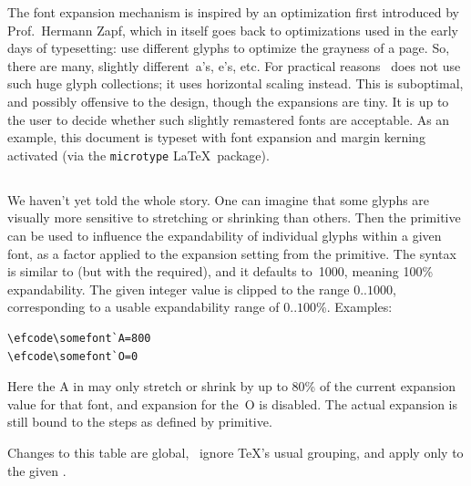 \documentclass{pdftexmanual}
\begin{document}
The font expansion mechanism is inspired by an optimization first
introduced by Prof.~Hermann Zapf, which in itself goes back to
optimizations used in the early days of typesetting: use different
glyphs to optimize the grayness of a page. So, there are many, slightly
different~a's, e's, etc. For practical reasons \PDFTEX\ does not use
such huge glyph collections; it uses horizontal scaling instead. This is
sub\hyph optimal, and possibly offensive to the design, though the
expansions are tiny. It is up to the user to decide whether such
slightly remastered fonts are acceptable. As an example, this 
document is typeset with font expansion and margin kerning activated
(via the \texttt{microtype} \LaTeX\ package).

\subsection{}

We haven't yet told the whole story. One can imagine that some glyphs
are visually more sensitive to stretching or shrinking than others. Then
the  primitive can be used to influence the expandability of
individual glyphs within a given font, as a factor applied to the
expansion setting from the  primitive. The syntax is
similar to  (but with the  required), and it
defaults to~1000, meaning 100\% expandability. The given integer value
is clipped to the range $0..1000$, corresponding to a usable
expandability range of $0..100$\%. Examples:

\begin{verbatim}
\efcode\somefont`A=800
\efcode\somefont`O=0
\end{verbatim}

Here the A in  may only stretch or shrink by up to 80\% of
the current expansion value for that font, and expansion for the~O is
disabled. The actual expansion is still bound to the steps as defined by
 primitive.

Changes to this table are global, \ie\ ignore \TeX's usual grouping,
and apply only to the given .

\subsection{}
\end{document}

